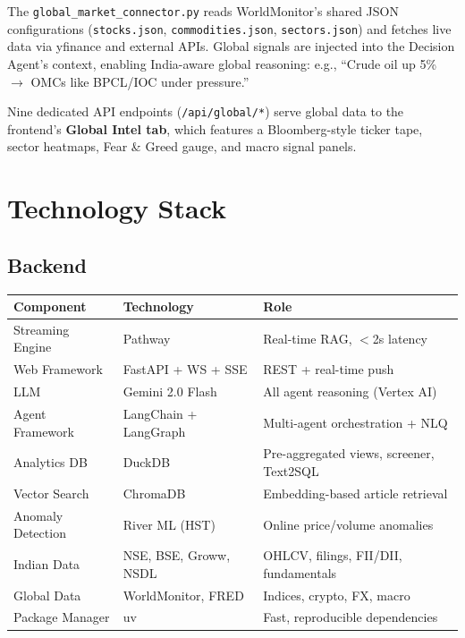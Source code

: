 \documentclass[11pt, a4paper]{article}
\begin{document}
The \texttt{global\_market\_connector.py} reads WorldMonitor's shared JSON configurations
(\texttt{stocks.json}, \texttt{commodities.json}, \texttt{sectors.json}) and fetches live data
via yfinance and external APIs. Global signals are injected into the Decision Agent's context,
enabling India-aware global reasoning: e.g., ``Crude oil up 5\% $\to$ OMCs like BPCL/IOC under pressure.''

Nine dedicated API endpoints (\texttt{/api/global/*}) serve global data to the frontend's
\textbf{Global Intel tab}, which features a Bloomberg-style ticker tape, sector heatmaps,
Fear \& Greed gauge, and macro signal panels.

\section{Technology Stack}

\subsection{Backend}

\begin{center}
\small
\begin{tabular}{L{3cm} L{3.6cm} L{6.6cm}}
  \toprule
  \textbf{Component} & \textbf{Technology} & \textbf{Role} \\
  \midrule
  Streaming Engine  & Pathway            & Real-time RAG, $<$2s latency \\
  Web Framework     & FastAPI + WS + SSE & REST + real-time push \\
  LLM               & Gemini 2.0 Flash   & All agent reasoning (Vertex AI) \\
  Agent Framework   & LangChain + LangGraph & Multi-agent orchestration + NLQ \\
  Analytics DB      & DuckDB             & Pre-aggregated views, screener, Text2SQL \\
  Vector Search     & ChromaDB           & Embedding-based article retrieval \\
  Anomaly Detection & River ML (HST)     & Online price/volume anomalies \\
  Indian Data       & NSE, BSE, Groww, NSDL & OHLCV, filings, FII/DII, fundamentals \\
  Global Data       & WorldMonitor, FRED & Indices, crypto, FX, macro \\
  Package Manager   & uv                 & Fast, reproducible dependencies \\
  \bottomrule
\end{tabular}
\end{center}
\end{document}
